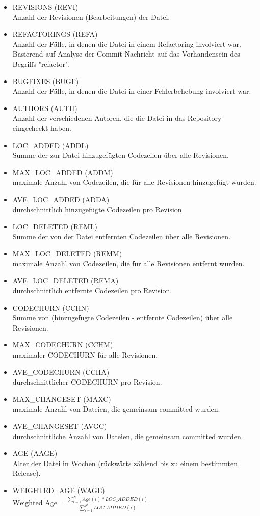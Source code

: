 \label{moser-metrics}
\begin{multicols}{2}
\begin{itemize}
\setlength{\itemsep}{-2pt}
\item REVISIONS (REVI)\\Anzahl der Revisionen (Bearbeitungen) der Datei.
\item REFACTORINGS (REFA)\\Anzahl der Fälle, in denen die Datei in einem Refactoring involviert war. Basierend auf Analyse der Commit-Nachricht auf das Vorhandensein des Begriffs "refactor".
\item BUGFIXES (BUGF)\\Anzahl der Fälle, in denen die Datei in einer Fehlerbehebung involviert war.
\item AUTHORS (AUTH)\\Anzahl der verschiedenen Autoren, die die Datei in das Repository eingecheckt haben.
\item LOC\_ADDED (ADDL)\\Summe der zur Datei hinzugefügten Codezeilen über alle Revisionen.
\item MAX\_LOC\_ADDED (ADDM)\\maximale Anzahl von Codezeilen, die für alle Revisionen hinzugefügt wurden.
\item AVE\_LOC\_ADDED (ADDA)\\durchschnittlich hinzugefügte Codezeilen pro Revision.
\item LOC\_DELETED (REML)\\Summe der von der Datei entfernten Codezeilen über alle Revisionen.
\item MAX\_LOC\_DELETED (REMM)\\maximale Anzahl von Codezeilen, die für alle Revisionen entfernt wurden.
\item AVE\_LOC\_DELETED (REMA)\\durchschnittlich entfernte Codezeilen pro Revision.
\item CODECHURN (CCHN)\\Summe von (hinzugefügte Codezeilen - entfernte Codezeilen) über alle Revisionen.
\item MAX\_CODECHURN (CCHM)\\maximaler CODECHURN für alle Revisionen.
\item AVE\_CODECHURN (CCHA)\\durchschnittlicher CODECHURN pro Revision.
\item MAX\_CHANGESET (MAXC)\\maximale Anzahl von Dateien, die gemeinsam committed wurden.
\item AVE\_CHANGESET (AVGC)\\durchschnittliche Anzahl von Dateien, die gemeinsam committed wurden.
\item AGE (AAGE)\\Alter der Datei in Wochen (rückwärts zählend bis zu einem bestimmten Release).
\item WEIGHTED\_AGE (WAGE)\\$\text{Weighted Age} = \frac{\sum_{i=1}^N Age(i)*LOC\_ADDED(i)}{\sum_{i=1}^N LOC\_ADDED(i)}$
\end{itemize}
\end{multicols}

